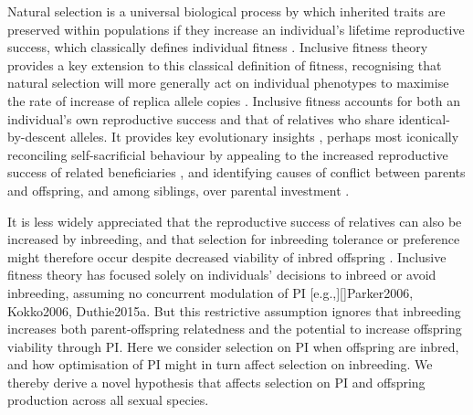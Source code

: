 \documentclass[12pt]{article}
\begin{document}
Natural selection is a universal biological process by which inherited traits are preserved within populations if they increase an individual's lifetime reproductive success, which classically defines individual fitness \cite[][]{Darwin1859, Dawkins1982}. Inclusive fitness theory \citeyearpar[][]{Hamilton1964, Hamilton1964a} provides a key extension to this classical definition of fitness, recognising that natural selection will more generally act on individual phenotypes to maximise the rate of increase of replica allele copies \cite[][]{Grafen2006}. Inclusive fitness accounts for both an individual's own reproductive success and that of relatives who share identical-by-descent alleles. It provides key evolutionary insights \cite[][]{Gardner2014}, perhaps most iconically reconciling self-sacrificial behaviour by appealing to the increased reproductive success of related beneficiaries \cite[][]{Hamilton1964}, and identifying causes of conflict between parents and offspring, and among siblings, over parental investment \cite[hereafter `PI';][]{Trivers1972, Trivers1974}.

It is less widely appreciated that the reproductive success of relatives can also be increased by inbreeding, and that selection for inbreeding tolerance or preference might therefore occur despite decreased viability of inbred offspring \cite[i.e., ``inbreeding depression''][]{Parker1979}. Inclusive fitness theory has focused solely on individuals' decisions to inbreed or avoid inbreeding, assuming no concurrent modulation of PI [e.g.,][]{Parker2006, Kokko2006, Duthie2015a}. But this restrictive assumption ignores that inbreeding increases both parent-offspring relatedness and the potential to increase offspring viability through PI. Here we consider selection on PI when offspring are inbred, and how optimisation of PI might in turn affect selection on inbreeding. We thereby derive a novel hypothesis that affects selection on PI and offspring production across all sexual species.
\end{document}
